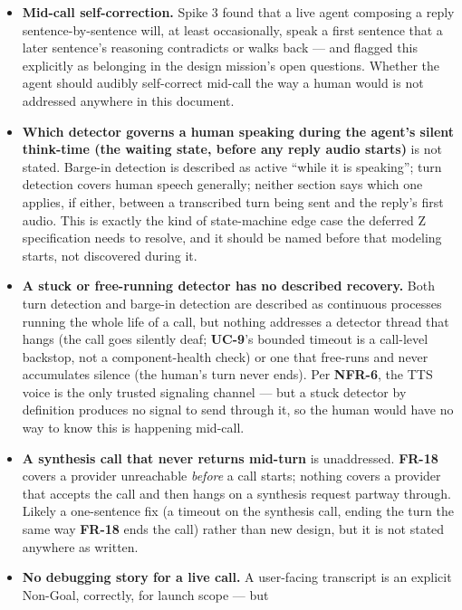 \documentclass[a4paper,11pt]{report}
\newcommand{\uc}[1]{\textbf{UC-#1}}
\newcommand{\fr}[1]{\textbf{FR-#1}}
\newcommand{\nfr}[1]{\textbf{NFR-#1}}
\begin{document}
\begin{itemize}
    fixed. How the production system surfaces low-confidence capture to
    the human is undesigned.
  \item \textbf{Mid-call self-correction.} Spike 3 found that a live
    agent composing a reply sentence-by-sentence will, at least
    occasionally, speak a first sentence that a later sentence's
    reasoning contradicts or walks back --- and flagged this explicitly
    as belonging in the design mission's open questions. Whether the
    agent should audibly self-correct mid-call the way a human would is
    not addressed anywhere in this document.
  \item \textbf{Which detector governs a human speaking during the
    agent's silent think-time (the waiting state, before any reply audio
    starts)} is not stated. Barge-in detection is described as active
    ``while it is speaking''; turn detection covers human speech
    generally; neither section says which one applies, if either,
    between a transcribed turn being sent and the reply's first audio.
    This is exactly the kind of state-machine edge case the deferred Z
    specification needs to resolve, and it should be named before that
    modeling starts, not discovered during it.
  \item \textbf{A stuck or free-running detector has no described
    recovery.} Both turn detection and barge-in detection are described
    as continuous processes running the whole life of a call, but nothing
    addresses a detector thread that hangs (the call goes silently deaf;
    \uc{9}'s bounded timeout is a call-level backstop, not a
    component-health check) or one that free-runs and never accumulates
    silence (the human's turn never ends). Per \nfr{6}, the TTS voice is
    the only trusted signaling channel --- but a stuck detector by
    definition produces no signal to send through it, so the human would
    have no way to know this is happening mid-call.
  \item \textbf{A synthesis call that never returns mid-turn} is
    unaddressed. \fr{18} covers a provider unreachable \emph{before} a
    call starts; nothing covers a provider that accepts the call and then
    hangs on a synthesis request partway through. Likely a one-sentence
    fix (a timeout on the synthesis call, ending the turn the same way
    \fr{18} ends the call) rather than new design, but it is not stated
    anywhere as written.
  \item \textbf{No debugging story for a live call.} A user-facing
    transcript is an explicit Non-Goal, correctly, for launch scope --- but

\end{itemize}
\end{document}
